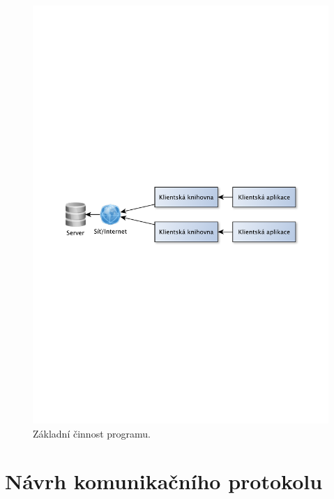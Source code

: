 \begin{figure}[h]
\centering
\includegraphics[trim=12cm 12cm 12cm 12cm, scale=0.8]{fig/princip}
\caption{Základní činnost programu.} %
\label{fig:FigureExample}
\end{figure}

\newpage
\section{Návrh komunikačního protokolu}
\label{navrh_protokol}

